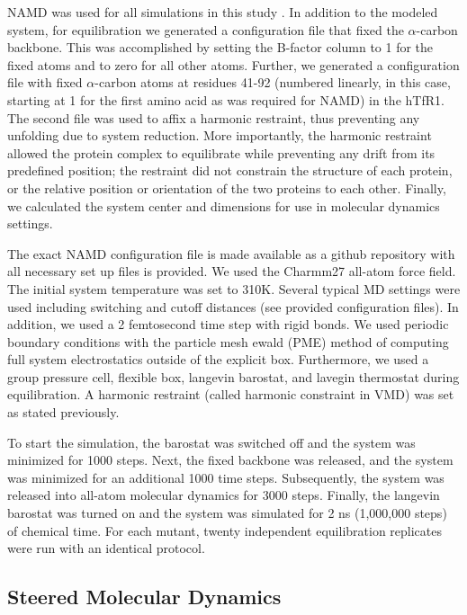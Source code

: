 \documentclass[12pt]{article}
\begin{document}
NAMD was used for all simulations in this study \citep{Phillips2005}. In addition to the modeled system, for equilibration we generated a configuration file that fixed the $\alpha$-carbon backbone. This was accomplished by setting the B-factor column to 1 for the fixed atoms and to zero for all other atoms. Further, we generated a configuration file with fixed $\alpha$-carbon atoms at residues 41-92 (numbered linearly, in this case, starting at 1 for the first amino acid as was required for NAMD) in the hTfR1. The second file was used to affix a harmonic restraint, thus preventing any unfolding due to system reduction. More importantly, the harmonic restraint allowed the protein complex to equilibrate while preventing any drift from its predefined position; the restraint did not constrain the structure of each protein, or the relative position or orientation of the two proteins to each other. Finally, we calculated the system center and dimensions for use in molecular dynamics settings.

The exact NAMD configuration file is made available as a github repository with all necessary set up files is provided. We used the Charmm27 \citep{Brooks1983} all-atom force field. The initial system temperature was set to 310K. Several typical MD settings were used including switching and cutoff distances (see provided configuration files). In addition, we used a 2 femtosecond time step with rigid bonds. We used periodic boundary conditions with the particle mesh ewald (PME) method of computing full system electrostatics outside of the explicit box. Furthermore, we used a group pressure cell, flexible box, langevin barostat, and lavegin thermostat during equilibration. A harmonic restraint (called harmonic constraint in VMD) was set as stated previously. 

To start the simulation, the barostat was switched off and the system was minimized for 1000 steps. Next, the fixed backbone was released, and the system was minimized for an additional 1000 time steps. Subsequently, the system was released into all-atom molecular dynamics for 3000 steps. Finally, the langevin barostat was turned on and the system was simulated for 2 ns (1,000,000 steps) of chemical time. For each mutant, twenty independent equilibration replicates were run with an identical protocol.

\subsection{Steered Molecular Dynamics}
\end{document}
